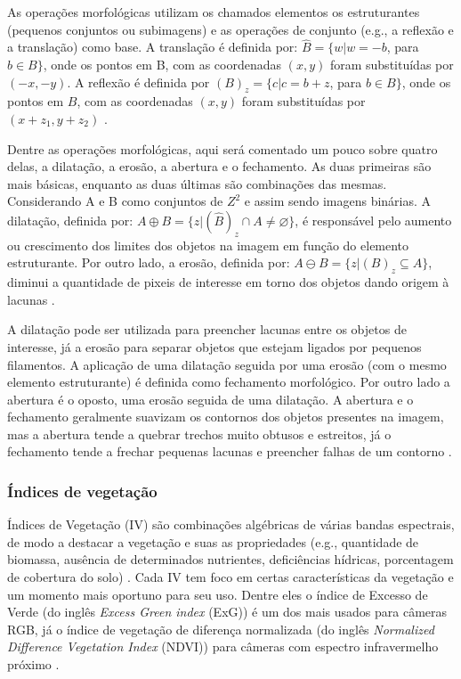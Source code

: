\documentclass[12pt, a4paper, english, brazil]{article}
\begin{document}
As operações morfológicas utilizam os chamados elementos os estruturantes (pequenos conjuntos ou subimagens) e as operações de conjunto (e.g., a reflexão e a translação) como base. A translação é definida por: $\hat{B} = \{w | w = -b$, para $b \in B\}$, onde os pontos em B, com as coordenadas $(x, y)$ foram substituídas por $(-x, -y)$. A reflexão é definida por $(B)_z = \{c | c = b + z$, para $b \in B\}$, onde os pontos em $B$, com as coordenadas $(x, y)$ foram substituídas por
$(x + z_1, y + z_2)$ \cite{AlAzawee_2015}.

Dentre as operações morfológicas, aqui será comentado um pouco sobre quatro delas, a dilatação, a erosão, a abertura e o fechamento. As duas primeiras são mais básicas, enquanto as duas últimas são combinações das mesmas. Considerando A e B como conjuntos de $Z^2$ e assim sendo imagens binárias. A dilatação, definida por: $A \oplus B = \{z | (\hat{B})_z \cap A \neq \varnothing \}$, é responsável pelo aumento ou crescimento dos limites dos objetos na imagem em função do elemento estruturante. Por outro lado, a erosão, definida por: $A \ominus B = \{ z | (B)_z \subseteq A\}$, diminui a quantidade de pixeis de interesse em torno dos objetos dando origem à lacunas \cite{Marques_Filho_1999}.

A dilatação pode ser utilizada para preencher lacunas entre os objetos de interesse, já a erosão para separar objetos que estejam ligados por pequenos filamentos. A aplicação de uma dilatação seguida por uma erosão (com o mesmo elemento estruturante) é definida como fechamento morfológico. Por outro lado a abertura é o oposto, uma erosão seguida de uma dilatação. A abertura e o fechamento geralmente suavizam os contornos dos objetos presentes na imagem, mas a abertura tende a quebrar trechos muito obtusos e estreitos, já o fechamento tende a frechar pequenas lacunas e preencher falhas de um contorno \cite{Gonzalez_Woods_2010, Kaur_Sahambi_2015}.

\subsubsection{Índices de vegetação}

Índices de Vegetação (IV) são combinações algébricas de várias bandas espectrais, de modo a destacar a vegetação e suas as propriedades (e.g., quantidade de biomassa, ausência de determinados nutrientes, deficiências hídricas, porcentagem de cobertura do solo) \cite{Candiago_2015}. Cada IV tem foco em certas características da vegetação e um momento mais oportuno para seu uso. Dentre eles o índice de Excesso de Verde (do inglês \textit{Excess Green index} (ExG)) é um dos mais usados para câmeras RGB, já o 
índice de vegetação de diferença normalizada (do inglês \textit{Normalized Difference Vegetation Index} (NDVI)) para câmeras com espectro infravermelho próximo \cite{Pereira_Junior_2020}.
\end{document}
